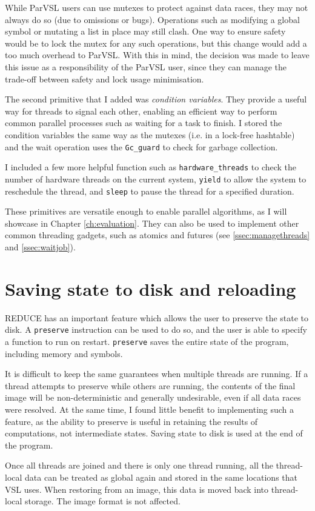 While ParVSL users can use mutexes to protect against data races, they may not always do so
(due to omissions or bugs). Operations such as modifying a global symbol or mutating a list in place
may still clash.
One way to ensure safety would be to lock the mutex for any such operations, but this change would add a
too much overhead to ParVSL. With this in mind, the decision was made to leave this issue as a responsibility
of the ParVSL user, since they can manage the trade-off between safety and lock usage minimisation.

The second primitive that I added was \emph{condition variables}. They provide a useful way for
threads to signal each other, enabling an efficient way to perform common parallel processes such as
waiting for a task to finish. I stored the condition variables the same way as the mutexes (i.e. in a lock-free
hashtable) and the wait operation uses the \verb|Gc_guard| to check for garbage collection.

I included a few more helpful function such as \verb|hardware_threads| to check the number of hardware
threads on the current system, \verb|yield| to allow the system to reschedule the thread, and
\verb|sleep| to pause the thread for a specified duration.

These primitives are versatile enough to enable parallel algorithms, as I will showcase in Chapter \ref{ch:evaluation}.
They can also be used to implement other common threading gadgets, such as atomics and futures
(see \ref{ssec:managethreads} and \ref{ssec:waitjob}).

\section{Saving state to disk and reloading}
\label{sec:preserve}

REDUCE has an important feature which allows the user to preserve the state to disk. A \texttt{preserve} instruction can be
used to do so, and the user is able to specify a function to run on restart. \verb|preserve| saves the entire state of the
program, including memory and symbols.

It is difficult to keep the same guarantees when multiple threads are running.
If a thread attempts to preserve while others
are running, the contents of the final image will be non-deterministic and generally undesirable,
even if all data races were resolved. At the same time, I found little benefit to implementing such
a feature, as the ability to preserve is useful in retaining the results of computations, not intermediate states.
Saving state to disk is used at the end of the program.

Once all threads are joined and there is only one thread running, all the
thread-local data can be treated as global again and stored in the same locations that
VSL uses. When restoring from an image, this data is moved back into thread-local storage. The image
format is not affected.